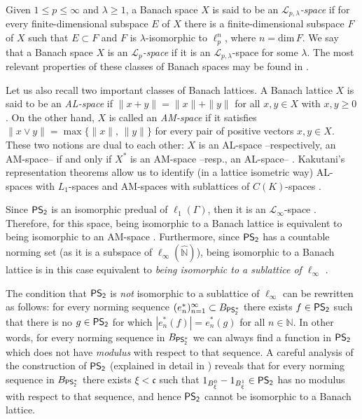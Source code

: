 \documentclass[11pt]{amsart}
\theoremstyle{definition}
\numberwithin{equation}{section}
\newcommand\PS{{\normalfont\textsf{PS}}_\textsf{2}}
\begin{document}
Given $1\leq p\leq \infty$ and $\lambda\geq 1$, a Banach space $X$ is said to be an \emph{$\mathcal{L}_{p,\lambda}$-space} if for every finite-dimensional subspace $E$ of $X$ there is a finite-dimensional subspace $F$ of $X$ such that $E\subset F$ and $F$ is $\lambda$-isomorphic to $\ell_p^{n}$, where $n=\text{dim}\, F$. We say that a Banach space $X$ is an \emph{$\mathcal{L}_p$-space} if it is an $\mathcal{L}_{p,\lambda}$-space for some $\lambda$. The most relevant properties of these classes of Banach spaces may be found in \cite{LP68, LR69}.

Let us also recall two important classes of Banach lattices. A Banach lattice $X$ is said to be an \textit{AL-space} if $\|x+y\|=\|x\|+\|y\|$ for all $x,y\in X$ with $x,y\geq 0$. On the other hand, $X$ is called an \textit{AM-space} if it satisfies $\|x\lor y\|=\max\{\|x\|,\,\|y\|\}$ for every pair of positive vectors $x,y\in X$. These two notions are dual to each other: $X$ is an AL-space --respectively, an AM-space-- if and only if $X^*$ is an AM-space --resp., an AL-space-- \cite[Theorem 7, Section 3]{Lacey-book}. Kakutani's representation theorems allow us to identify (in a lattice isometric way) AL-spaces with $L_1$-spaces \cite[Theorem 1.b.2]{LT2-book} and AM-spaces with sublattices of $C(K)$-spaces \cite[Theorem 1.b.6]{LT2-book}.


 
Since $\PS$ is an isomorphic predual of $\ell_1(\Gamma)$, then it is an $\mathcal{L}_\infty$-space \cite[Theorem III (a)]{LR69}. Therefore, for this space, being isomorphic to a Banach lattice is equivalent to being isomorphic to an AM-space \cite[Corollary 2.2]{dHMST23}. Furthermore, since $\PS$ has a countable norming set (as it is a subspace of $\ell_\infty(\widehat{\mathbb{N}})$), being isomorphic to a Banach lattice is in this case equivalent to \textit{being isomorphic to a sublattice of $\ell_\infty$} \cite[Proposition 4.1]{dHMST23}.

The condition that $\PS$ is \textit{not} isomorphic to a sublattice of $\ell_\infty$ can be rewritten as follows: for every norming sequence $(e_n^*)_{n=1}^\infty \subset B_{\PS^*}$ there exists $f\in \PS$ such that there is no $g\in \PS$ for which $|e_n^*(f)|=e_n^*(g)$ for all $n\in\mathbb{N}$. In other words, for every norming sequence in $B_{\PS^*}$ we can always find a function in $\PS$ which does not have \textit{modulus} with respect to that sequence. A careful analysis of the construction of $\PS$ (explained in detail in \cite[Theorem 4.4]{dHMST23}) reveals that for every norming sequence in $B_{\PS^*}$ there exists $\xi<\mathfrak{c}$ such that $1_{B_\xi^0}-1_{B_\xi^1}\in \PS$ has no modulus with respect to that sequence, and hence $\PS$ cannot be isomorphic to a Banach lattice.
\end{document}
